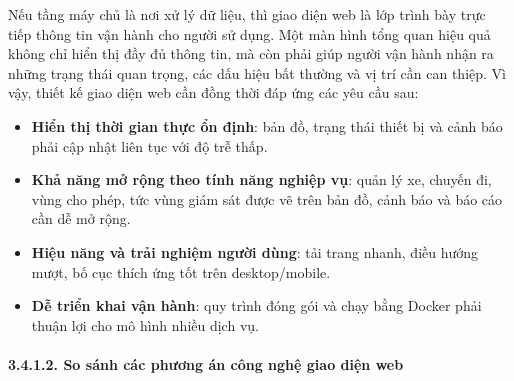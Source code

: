 \documentclass[a4paper]{extarticle}
\providecommand{\tightlist}{%
  \setlength{\itemsep}{0pt}\setlength{\parskip}{0pt}}
\begin{document}
Nếu tầng máy chủ là nơi xử lý dữ liệu, thì giao diện web là lớp trình bày
trực tiếp thông tin vận hành cho người sử dụng. Một màn hình tổng quan
hiệu quả không chỉ hiển thị đầy đủ thông tin, mà còn phải giúp người
vận hành nhận ra những trạng thái quan trọng, các dấu hiệu bất thường và
vị trí cần can thiệp. Vì vậy, thiết kế giao diện web cần đồng thời đáp
ứng các yêu cầu sau:

\begin{itemize}
\tightlist
\item
  \textbf{Hiển thị thời gian thực ổn định}: bản đồ, trạng thái thiết bị
  và cảnh báo phải cập nhật liên tục với độ trễ thấp.
\item
  \textbf{Khả năng mở rộng theo tính năng nghiệp vụ}: quản lý xe, chuyến
  đi, vùng cho phép, tức vùng giám sát được vẽ trên bản đồ, cảnh báo và báo
  cáo cần dễ mở rộng.
\item
  \textbf{Hiệu năng và trải nghiệm người dùng}: tải trang nhanh, điều
  hướng mượt, bố cục thích ứng tốt trên desktop/mobile.
\item
  \textbf{Dễ triển khai vận hành}: quy trình đóng gói và chạy bằng
  Docker phải thuận lợi cho mô hình nhiều dịch vụ.
\end{itemize}

\paragraph{3.4.1.2. So sánh các phương án công nghệ
giao diện web}\label{3142-so-suxe1nh-cuxe1c-phux1b0ux1a1ng-uxe1n-cuxf4ng-nghux1ec7-frontend}
\end{document}
